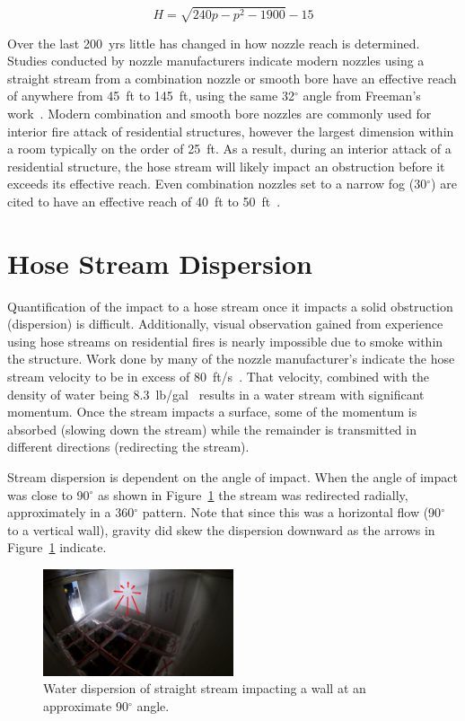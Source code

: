 \documentclass[12pt,oneside]{book}
\begin{document}
\begin{equation*}
	H = \sqrt{240p - p^2 - 1900} -15
\end{equation*}

Over the last 200~yrs little has changed in how nozzle reach is determined. Studies conducted by nozzle manufacturers indicate modern nozzles using a straight stream from a combination nozzle or smooth bore have an effective reach of anywhere from 45~ft to 145~ft, using the same 32$^\circ$ angle from Freeman's work~\cite{TFT_Reach,Elkhart_Reach,Akron_Reach}. Modern combination and smooth bore nozzles are commonly used for interior fire attack of residential structures, however the largest dimension within a room typically on the order of 25~ft. As a result, during an interior attack of a residential structure, the hose stream will likely impact an obstruction before it exceeds its effective reach. Even combination nozzles set to a narrow fog (30$^\circ$) are cited to have an effective reach of 40~ft to 50~ft~\cite{Elkhart_Reach}.

\section{Hose Stream Dispersion}
\label{sec:dispersion}
Quantification of the impact to a hose stream once it impacts a solid obstruction (dispersion) is difficult. Additionally, visual observation gained from experience using hose streams on residential fires is nearly impossible due to smoke within the structure. Work done by many of the nozzle manufacturer's indicate the hose stream velocity to be in excess of 80~ft/s~\cite{NBFU:EffectiveReach}. That velocity, combined with the density of water being 8.3~lb/gal~\cite{SFPEHandbookPurser} results in a water stream with significant momentum. Once the stream impacts a surface, some of the momentum is absorbed (slowing down the stream) while the remainder is transmitted in different directions (redirecting the stream). 

Stream dispersion is dependent on the angle of impact. When the angle of impact was close to 90$^{\circ}$ as shown in Figure~\ref{fig:90DegreeImpact} the stream was redirected radially, approximately in a 360$^{\circ}$ pattern. Note that since this was a horizontal flow (90$^{\circ}$ to a vertical wall), gravity did skew the dispersion downward as the arrows in Figure~\ref{fig:90DegreeImpact} indicate.  

\begin{figure}[!ht]
\centering
\includegraphics[width=0.5\textwidth]{Figures/Water_Distribution/Nozzle_Directions/Exterior_AtWall_SB_Arrows}
\caption[Water Dispersion Straight Stream 90$^{\circ}$ Impact Angle]{Water dispersion of straight stream impacting a wall at an approximate 90$^{\circ}$ angle.}
\label{fig:90DegreeImpact}
\end{figure}
\end{document}
